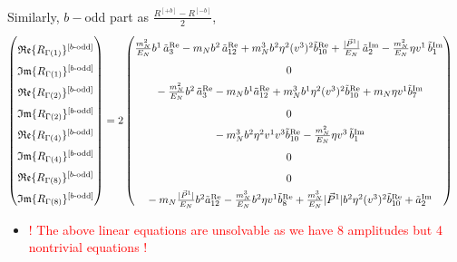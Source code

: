 \documentclass[]{article}
\numberwithin{equation}{section}
\newcommand{\bvec}{b}
\newcommand{\mN}{m_N}
\begin{document}
Similarly,  $b-$odd part as $\frac{R^{[+b]}-R^{[-b]}}{2}$,
\begin{align}
    \begin{pmatrix}
        \rule{0pt}{16pt} \mathfrak{Re}\{ R_{\Gamma(1)}\}^{[b\text{-odd}]} \\
        \rule{0pt}{16pt} \mathfrak{Im}\{ R_{\Gamma(1)}\}^{[b\text{-odd}]} \\
        \rule{0pt}{16pt} \mathfrak{Re}\{ R_{\Gamma(2)}\}^{[b\text{-odd}]} \\
        \rule{0pt}{16pt} \mathfrak{Im}\{ R_{\Gamma(2)}\}^{[b\text{-odd}]} \\
        \rule{0pt}{16pt} \mathfrak{Re}\{ R_{\Gamma(4)}\}^{[b\text{-odd}]} \\
        \rule{0pt}{16pt} \mathfrak{Im}\{ R_{\Gamma(4)}\}^{[b\text{-odd}]} \\
        \rule{0pt}{16pt} \mathfrak{Re}\{ R_{\Gamma(8)}\}^{[b\text{-odd}]} \\
        \rule{0pt}{16pt} \mathfrak{Im}\{ R_{\Gamma(8)}\}^{[b\text{-odd}]}
    \end{pmatrix} &= 2\begin{pmatrix}
     \rule{0pt}{16pt}   \frac{\mN^2}{E_N} \bvec^1\, \tilde a^{\text{Re}}_3-  \mN  \bvec^2 \, \tilde a^{\text{Re}}_{12}+  \mN^3  \bvec^2 \eta^2 (v^3)^2 \tilde b^{\text{Re}}_{10} +\frac{|\vec{P}^1|}{E_N}\, \tilde a^{\text{Im}}_2- \frac{\mN^2}{E_N} \eta v^1\, \tilde b^{\text{Im}}_1\\
      \rule{0pt}{16pt}  0\\
      \rule{0pt}{16pt}  -  \frac{\mN^2}{E_N} \bvec^2\, \tilde a^{\text{Re}}_3
		-  \mN   \bvec^1  \tilde a^{\text{Re}}_{12}+ \mN^3  \bvec^1 \eta^2 (v^3)^2 \tilde b^{\text{Re}}_{10}+\mN \eta v^1  \tilde b^{\text{Im}}_7 \\
      \rule{0pt}{16pt} 0\\
      \rule{0pt}{16pt} -\mN^3 \bvec^2 \eta^2 v^1 v^3\tilde b^{\text{Re}}_{10}-\frac{\mN^2}{E_N} \eta v^3\, \tilde b^{\text{Im}}_1\\
      \rule{0pt}{16pt}0\\
      \rule{0pt}{16pt} 0\\
      \rule{0pt}{16pt} -  \mN  \frac{|\vec{P}^1|}{E_N} \bvec^2  \tilde a^{\text{Re}}_{12}- \frac{  \mN^3}{E_N}  \bvec^2 \eta v^1  \tilde b^{\text{Re}}_8+ \frac{ \mN^3}{E_N}  |\vec{P}^1| \bvec^2 \eta^2 (v^3)^2 \tilde b^{\text{Re}}_{10}+\tilde a^{\text{Im}}_2
    \end{pmatrix}
\end{align}
\begin{itemize}
    \item \textcolor{red}{! The above linear equations are unsolvable as we have 8 amplitudes but 4 nontrivial equations !}
\end{itemize}
\end{document}
